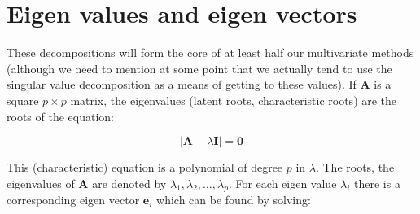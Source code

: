 











\section{Eigen values and eigen vectors}

These decompositions will form the core of at least half our multivariate methods (although we need to mention at some point that we actually tend to use the singular value decomposition as a means of getting to these values).   If $\boldsymbol{A}$ is a square $p \times p$ matrix, the eigenvalues (latent roots, characteristic roots) are the roots of the equation:

\begin{displaymath}
|\boldsymbol{A} - \lambda \boldsymbol{I}| = \boldsymbol{0}
\end{displaymath}

This (characteristic) equation is a polynomial of degree $p$ in $\lambda$.   The roots, the eigenvalues of $\boldsymbol{A}$ are denoted by $\lambda_{1}, \lambda_{2}, \ldots, \lambda_{p}$.   For each eigen value $\lambda_{i}$ there is a corresponding eigen vector $\boldsymbol{e}_{i}$ which can be found by solving:

